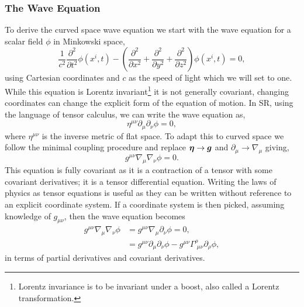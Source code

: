 \subsubsection{The Wave Equation}
To derive the curved space wave equation we start with the wave equation for a scalar field $\phi$ in Minkowski space, 
\begin{equation}
\frac{1}{c^2}\frac{\partial^2}{\partial t^2} \phi(x^i,t) - \left(\frac{\partial^2}{\partial x^2}+\frac{\partial^2}{\partial y^2}+\frac{\partial^2}{\partial z^2} \right)\phi(x^i,t)=0, \label{intro:eq:fullflatwave}
\end{equation}
using Cartesian coordinates and $c$ as the speed of light which we will set to one. While this equation is Lorentz invariant\footnote{Lorentz invariance is to be invariant under a boost, also called a Lorentz transformation.} it is not generally covariant, changing coordinates can change the explicit form of the equation of motion. In SR, using the language of tensor calculus, we can write the wave equation as, 
\begin{equation}
\eta^{\mu\nu}\partial_\mu\partial_\nu\phi=0\label{intro:eq:waveeqn},
\end{equation}
where $\eta^{\mu\nu}$ is the inverse metric of flat space. To adapt this to curved space we follow the minimal coupling procedure and replace $\boldsymbol{\eta} \rightarrow \boldsymbol{g}$ and $\partial_\mu \rightarrow \nabla_\mu$ giving,
\begin{equation} 
g^{\mu\nu}\nabla_\mu \nabla_\nu\phi =0. \label{intro:eq:grwave}
\end{equation}
This equation is fully covariant as it is a contraction of a tensor with some covariant derivatives; it is a tensor differential equation. Writing the laws of physics as tensor equations is useful as they can be written without reference to an explicit coordinate system. If a coordinate system is then picked, assuming knowledge of $g_{\mu\nu}$, then the wave equation becomes
\begin{align}
g^{\mu\nu}\nabla_\mu \nabla_\nu \phi &= g^{\mu\nu}\nabla_\mu \partial_\nu \phi =0,\\
&= g^{\mu\nu}\partial_\mu \partial_\nu \phi - g^{\mu\nu}\Gamma^\rho_{\,\,\mu\nu}\partial_\rho \phi,
\end{align}
in terms of partial derivatives and covariant derivatives. 

